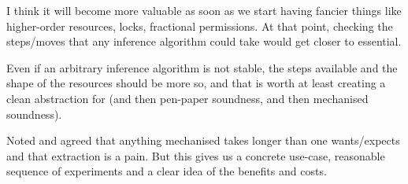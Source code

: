 I think it will become more valuable as soon as we start having fancier things
like higher-order resources, locks, fractional permissions. At that point,
checking the steps/moves that any inference algorithm could take would get
closer to essential.

Even if an arbitrary inference algorithm is not stable, the steps available and
the shape of the resources should be more so, and that is worth at least
creating a clean abstraction for (and then pen-paper soundness, and then
mechanised soundness).

Noted and agreed that anything mechanised takes longer than one wants/expects
and that extraction is a pain. But this gives us a concrete use-case,
reasonable sequence of experiments and a clear idea of the benefits and costs.


